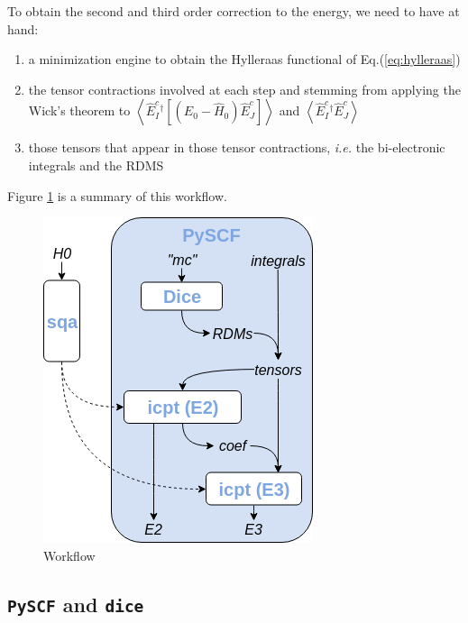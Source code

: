 \documentclass{article}
\newcommand  \var[1]       {\texttt{#1}}
\newcommand  \Expect[1]    {\left\langle  #1 \right\rangle}
\begin{document}
To obtain the second and third order correction to the energy, we need to have at hand:
\begin{enumerate}
\item a minimization engine to obtain the Hylleraas functional of Eq.(\ref{eq:hylleraas})
\item the tensor contractions involved at each step and stemming from applying the Wick's theorem to
$\Expect{\hat{E}_I ^c{ }^\dagger[(E_0-\hat{H}_0)\hat{E}^c_J ]}$ 
and $\Expect{\hat{E}_I ^c{ }^\dagger\hat{E}^c_J }$ 
\item those tensors that appear in those tensor contractions,
      \textit{i.e.} the bi-electronic integrals and the RDMS
\end{enumerate}
Figure \ref{fig:workflow} is a summary of this workflow.
\begin{figure}[!htbp]
\begin{center}
\includegraphics[width=.5\linewidth]{workflow.png}
\end{center}
\caption{Workflow}
\label{fig:workflow}
\end{figure}

\subsection{\var{PySCF} and \var{dice}}
\end{document}
